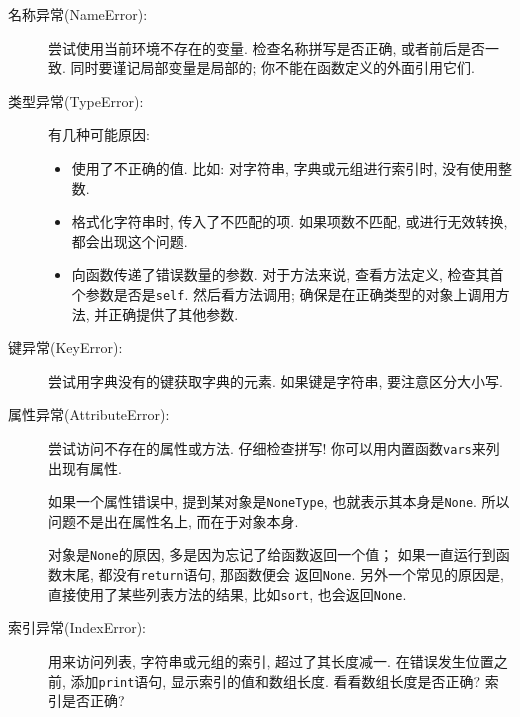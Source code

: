 \documentclass[10pt]{book}
\begin{document}
\begin{description}

\item[名称异常(NameError):] 尝试使用当前环境不存在的变量. 
检查名称拼写是否正确, 或者前后是否一致. 
同时要谨记局部变量是局部的; 你不能在函数定义的外面引用它们.

\item[类型异常(TypeError):] 有几种可能原因:

\begin{itemize}

\item  使用了不正确的值. 比如: 对字符串, 字典或元组进行索引时, 没有使用整数. 

\item 格式化字符串时, 传入了不匹配的项. 
如果项数不匹配, 或进行无效转换, 都会出现这个问题. 

\item 向函数传递了错误数量的参数. 对于方法来说, 查看方法定义, 
检查其首个参数是否是{\tt self}.
然后看方法调用; 确保是在正确类型的对象上调用方法, 
并正确提供了其他参数. 

\end{itemize}

\item[键异常(KeyError):]  尝试用字典没有的键获取字典的元素. 
如果键是字符串, 要注意区分大小写. 

\item[属性异常(AttributeError):] 尝试访问不存在的属性或方法. 
仔细检查拼写! 你可以用内置函数{\tt vars}来列出现有属性. 

如果一个属性错误中, 提到某对象是{\tt NoneType},
也就表示其本身是{\tt None}.
所以问题不是出在属性名上, 而在于对象本身. 

对象是{\tt None}的原因, 多是因为忘记了给函数返回一个值；
如果一直运行到函数末尾, 都没有{\tt return}语句, 那函数便会
返回{\tt None}. 
另外一个常见的原因是, 直接使用了某些列表方法的结果, 比如{\tt sort}, 
也会返回{\tt None}.

\item[索引异常(IndexError):] 用来访问列表, 字符串或元组的索引, 超过了其长度减一. 
在错误发生位置之前, 添加{\tt print}语句, 显示索引的值和数组长度. 
看看数组长度是否正确? 索引是否正确?

\end{description}
\end{document}
